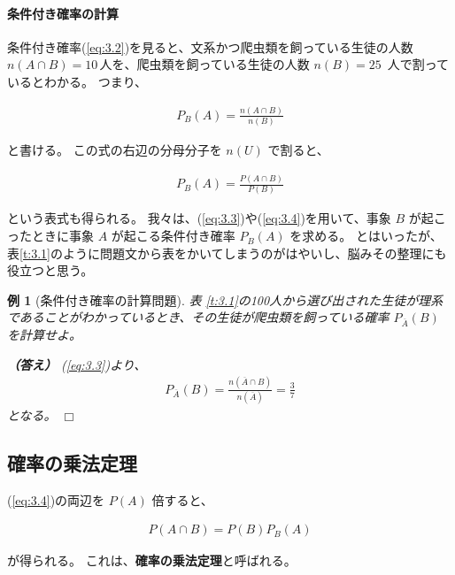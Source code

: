 \documentclass[12pt]{ltjsarticle}\usepackage{ifthen}\newcounter{enlarge}\setcounter{enlarge}{1}
\def\qed{\hfill $\Box$}
\newtheorem{eg}{例}
\begin{document}
\paragraph{条件付き確率の計算}

条件付き確率(\ref{eq:3.2})を見ると、文系かつ爬虫類を飼っている生徒の人数 $n(A \cap B) = 10\,$人を、爬虫類を飼っている生徒の人数 $n(B) = 25\,$ 人で割っているとわかる。
つまり、
\begin{oframed}
  \begin{align}
    P_B (A) = \frac{n(A \cap B)}{n(B)} \label{eq:3.3}
  \end{align}
\end{oframed}
\noindent
と書ける。
この式の右辺の分母分子を $n(U)$ で割ると、
\begin{oframed}
  \begin{align}
    P_B (A) = \frac{P(A \cap B)}{P(B)} \label{eq:3.4}
  \end{align}
\end{oframed}
\noindent
という表式も得られる。
我々は、(\ref{eq:3.3})や(\ref{eq:3.4})を用いて、事象 $B$ が起こったときに事象 $A$ が起こる条件付き確率 $P_B (A)$ を求める。
とはいったが、表\ref{t:3.1}のように問題文から表をかいてしまうのがはやいし、脳みその整理にも役立つと思う。

\begin{eg}[条件付き確率の計算問題]
  表 \ref{t:3.1}の100人から選び出された生徒が理系であることがわかっているとき、その生徒が爬虫類を飼っている確率 $P_{\overline{A}} (B)$ を計算せよ。

  \textbf{（答え）}
  (\ref{eq:3.3})より、
  \begin{align}
    P_{\overline{A}} (B) = \frac{n(\overline{A} \cap B)}{n(\overline{A})} = \frac{3}{7} \label{eq:3.5}
  \end{align}
  となる。
\qed\end{eg}

\subsection{確率の乗法定理}

(\ref{eq:3.4})の両辺を $P(A)$ 倍すると、
\begin{oframed}
  \begin{align}
    P(A \cap B) = P(B) P_B (A) \label{eq:3.6}
  \end{align}
\end{oframed}
\noindent
が得られる。
これは、\textbf{確率の乗法定理}と呼ばれる。
\end{document}
